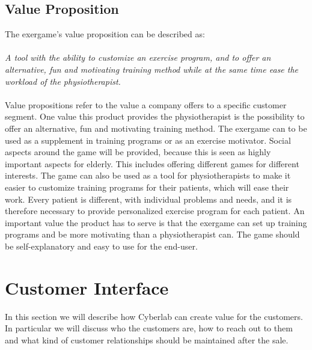 \subsection{Value Proposition}
The exergame's value proposition can be described as: \\ \\
\emph{A tool with the ability to customize an exercise program, and to offer an alternative, fun and motivating training method while at the same time ease the workload of the physiotherapist.}\\ \\
Value propositions refer to the value a company offers to a specific customer segment. One value this product provides the physiotherapist is the possibility to offer an alternative, fun and motivating training method. The exergame can to be used as a supplement in training programs or as an exercise motivator. Social aspects around the game will be provided, because this is seen as highly important aspects for elderly. This includes offering different games for different interests. The game can also be used as a tool for physiotherapists to make it easier to customize training programs for their patients, which will ease their work. Every patient is different, with individual problems and needs, and it is therefore necessary to provide personalized exercise program for each patient. An important value the product has to serve is that the exergame can set up training programs and be more motivating than a physiotherapist can. The game should be self-explanatory and easy to use for the end-user.
\section{Customer Interface}
In this section we will describe how Cyberlab can create value for the customers. In particular we will discuss who the customers are, how to reach out to them and what kind of customer relationships should be maintained after the sale. 

